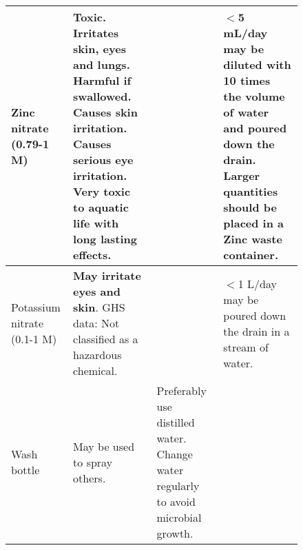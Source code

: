 \documentclass[10.5pt,a4paper]{article}
\begin{document}
\begin{figure}[h]
\begin{tabular}{|p{3cm}|p{4cm}|p{4.5cm}|p{4cm}|}
		\hline
		Zinc nitrate (0.79-1 M) & \textbf{Toxic}. \textbf{Irritates skin, eyes and lungs}. \textbf{Harmful if swallowed}. Causes skin irritation. \textbf{Causes serious eye irritation}. \textbf{Very toxic to aquatic life with long lasting effects}. & & $<$5 mL/day may be diluted with 10 times the volume of water and poured down the drain. Larger quantities should be placed in a Zinc waste container. \\
		\hline
		Potassium nitrate (0.1-1 M) & \textbf{May irritate eyes and skin}. GHS data: Not classified as a hazardous chemical. & & $<$1 L/day may be poured down the drain in a stream of water. \\
		\hline
		Wash bottle & May be used to spray others. & Preferably use distilled water. Change water regularly to avoid microbial growth. & \\
		\hline
	\end{tabular}
	\normalsize
\end{figure}







\nocite{*}
\end{document}
